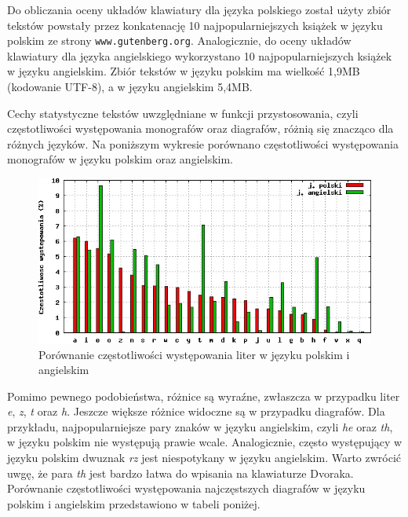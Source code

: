 \documentclass{xmgr}
\begin{document}
Do obliczania oceny układów klawiatury dla języka polskiego został użyty zbiór tekstów powstały przez konkatenację 10 najpopularniejszych książek w języku polskim ze strony {\tt www.gutenberg.org}. Analogicznie, do oceny układów klawiatury dla języka angielskiego wykorzystano 10 najpopularniejszych książek w języku angielskim. Zbiór tekstów w języku polskim ma wielkość 1,9MB (kodowanie UTF-8), a w języku angielskim 5,4MB.

Cechy statystyczne tekstów uwzględniane w funkcji przystosowania, czyli częstotliwości występowania monografów oraz diagrafów, różnią się znacząco dla różnych języków. Na poniższym wykresie porównano częstotliwości występowania monografów w języku polskim oraz angielskim.

\begin{figure}[!tbh]
\centering
\includegraphics[width=.8\hsize]{fig/frequencies}
\caption{Porównanie częstotliwości występowania liter w języku polskim i angielskim}
\end{figure}

Pomimo pewnego podobieństwa, różnice są wyraźne, zwłaszcza w przypadku liter \emph{e}, \emph{z}, \emph{t} oraz \emph{h}. Jeszcze większe różnice widoczne są w przypadku diagrafów. Dla przykładu, najpopularniejsze pary znaków w języku angielskim, czyli \emph{he} oraz \emph{th}, w języku polskim nie występują prawie wcale. Analogicznie, często występujący w języku polskim dwuznak \emph{rz} jest niespotykany w języku angielskim. Warto zwrócić uwgę, że para \emph{th} jest bardzo łatwa do wpisania na klawiaturze Dvoraka. Porównanie częstotliwości występowania najczęstszych diagrafów w języku polskim i angielskim przedstawiono w tabeli poniżej.\newline
\end{document}
